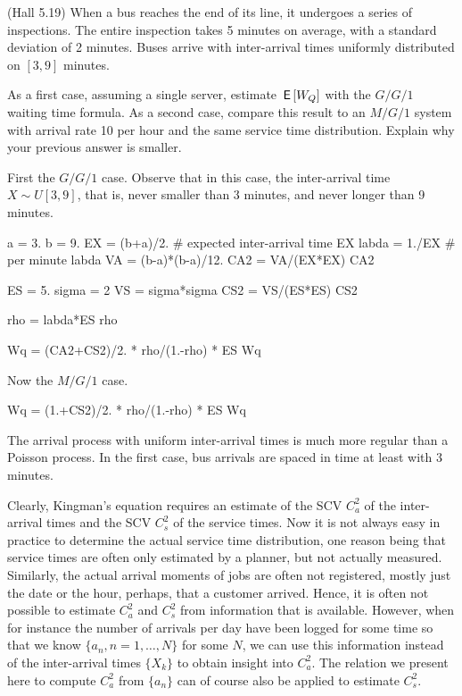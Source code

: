\begin{exercise}{\faPhoto}
  (Hall 5.19) When a bus reaches the end of its line, it undergoes a
  series of inspections. The entire inspection takes 5 minutes on
  average, with a standard deviation of 2 minutes. Buses arrive with
  inter-arrival times uniformly distributed on $[3,9]$ minutes.

As a first case,  assuming a single server, estimate $\,\mathsf{E}\left[W_Q\right]$ with the $G/G/1$ waiting time formula. As a second case, compare this result to an $M/G/1$ system with arrival rate 10 per hour and the same service time distribution. Explain why your previous answer is smaller. 
  \begin{solution}
First the $G/G/1$ case. Observe that in this case, the inter-arrival time $X\sim U[3,9]$, that is, never smaller than 3 minutes, and never longer than 9 minutes. 

\begin{pyconsole}
  
a = 3.
b = 9. 
EX = (b+a)/2. # expected inter-arrival time
EX
labda = 1./EX # per minute
labda
VA = (b-a)*(b-a)/12.
CA2 = VA/(EX*EX)
CA2

ES = 5.
sigma = 2
VS = sigma*sigma
CS2 = VS/(ES*ES)
CS2

rho = labda*ES
rho

Wq = (CA2+CS2)/2. * rho/(1.-rho) * ES
Wq
\end{pyconsole}

Now  the $M/G/1$ case.

\begin{pyconsole}
Wq = (1.+CS2)/2. * rho/(1.-rho) * ES
Wq
\end{pyconsole}

The arrival process with uniform inter-arrival times is much more
regular than a Poisson process. In the first case, bus arrivals are
spaced in time at least with 3 minutes.
    \end{solution}
\end{exercise}



Clearly, Kingman's equation requires an estimate of the SCV $C_a^2$ of
the inter-arrival times and the SCV $C_s^2$ of the service times. Now
it is not always easy in practice to determine the actual service time
distribution, one reason being that service times are often only
estimated by a planner, but not actually measured. Similarly, the
actual arrival moments of jobs are often not registered, mostly just
the date or the hour, perhaps, that a customer arrived.  Hence, it is
often not possible to estimate $C_a^2$ and $C_s^2$ from information
that is available.  However, when for instance the number of arrivals
per day have been logged for some time so that we know
$\{a_n, n=1,\ldots, N\}$ for some $N$, we can use this information
instead of the inter-arrival times $\{X_k\}$ to obtain insight into
$C_a^2$.  The relation we present here to compute $C_a^2$ from
$\{a_n\}$ can of course also be applied to estimate $C_s^2$.

